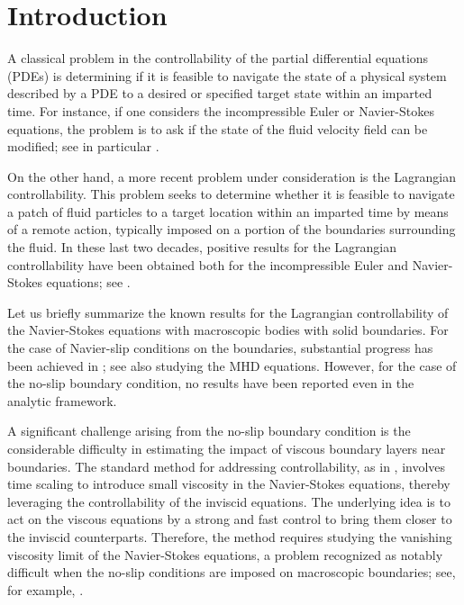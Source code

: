 \documentclass[11pt,a4paper]{article}
\numberwithin{equation}{section}
\begin{document}
    
    \tableofcontents


    \section{Introduction}
    \label{sec.intro}


A classical problem in the controllability of the partial differential equations (PDEs) is determining if it is feasible to navigate the state of a physical system described by a PDE to a desired or specified target state within an imparted time. For instance, if one considers the incompressible Euler or Navier-Stokes equations, the problem is to ask if the state of the fluid velocity field can be modified; see in particular \cite{Lio88,Cor93,Cor9596,Gla00,Cor07,CMS20}. 


On the other hand, a more recent problem under consideration is the Lagrangian controllability. This problem seeks to determine whether it is feasible to navigate a patch of fluid particles to a target location within an imparted time by means of a remote action, typically imposed on a portion of the boundaries surrounding the fluid. In these last two decades, positive results for the Lagrangian controllability have been obtained both for the incompressible Euler and Navier-Stokes equations; see \cite{Hor08,GlaHor10,GlaHor12,GlaHor16,HorKav17,LSZ22a}. 


Let us briefly summarize the known results for the Lagrangian controllability of the Navier-Stokes equations with macroscopic bodies with solid boundaries. For the case of Navier-slip conditions on the boundaries, substantial progress has been achieved in \cite{LSZ22a}; see also \cite{LSZ25} studying the MHD equations. However, for the case of the no-slip boundary condition, no results have been reported even in the analytic framework.


A significant challenge arising from the no-slip boundary condition is the considerable difficulty in estimating the impact of viscous boundary layers near boundaries. The standard method for addressing controllability, as in \cite{CMSZ19,CMS20,LSZ22a,LSZ22b}, involves time scaling to introduce small viscosity in the Navier-Stokes equations, thereby leveraging the controllability of the inviscid equations. The underlying idea is to act on the viscous equations by a strong and fast control to bring them closer to the inviscid counterparts. Therefore, the method requires studying the vanishing viscosity limit of the Navier-Stokes equations, a problem recognized as notably difficult when the no-slip conditions are imposed on macroscopic boundaries; see, for example, \cite{MaeMaz18}. 
\end{document}
